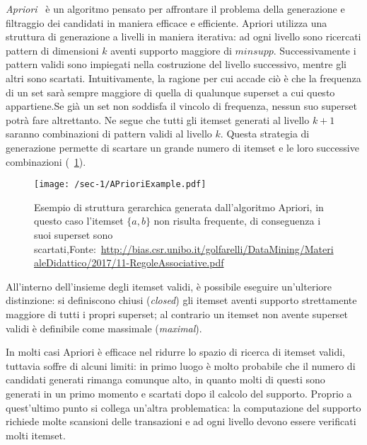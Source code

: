 \textit{Apriori}~\cite{agarwal2001tree} è un algoritmo pensato per affrontare il problema della generazione
e filtraggio dei candidati in maniera efficace e efficiente.
Apriori utilizza una struttura di generazione a livelli in maniera iterativa: ad ogni livello sono ricercati pattern di dimensioni \(k\)
aventi supporto maggiore di \(minsupp\).
Successivamente i pattern validi sono impiegati nella costruzione
del livello successivo, mentre gli altri sono scartati.
Intuitivamente, la ragione per cui accade ciò è che la frequenza di un set sarà sempre maggiore di
quella di qualunque superset a cui questo appartiene.Se già un set non soddisfa il vincolo di frequenza,
nessun suo superset potrà fare altrettanto.
Ne segue che tutti gli itemset generati al livello \(k + 1\) saranno combinazioni di pattern validi al livello
\(k\).
Questa strategia di generazione permette di scartare un grande numero di itemset e le loro successive
combinazioni (~\cref{fig:chap-1:apriori-example}).

\begin{figure}
  \texttt{[image: /sec-1/APrioriExample.pdf]}
  \caption{Esempio di struttura gerarchica generata dall'algoritmo Apriori, in questo caso l'itemset \( \{ a,b \} \) non risulta frequente, di conseguenza i suoi superset sono scartati,Fonte:~\url{http://bias.csr.unibo.it/golfarelli/DataMining/MaterialeDidattico/2017/11-RegoleAssociative.pdf}}%
  \label{fig:chap-1:apriori-example}
\end{figure}

All'interno dell'insieme degli itemset validi, è possibile eseguire un'ulteriore distinzione:
si definiscono chiusi (\textit{closed}) gli itemset aventi supporto strettamente maggiore di
tutti i propri superset; al contrario un itemset non avente superset validi è definibile come
massimale (\textit{maximal}).

In molti casi Apriori è efficace nel ridurre lo spazio di ricerca di itemset validi, tuttavia
soffre di alcuni limiti: in primo luogo è molto probabile che il numero di candidati generati rimanga comunque
alto, in quanto molti di questi sono generati in un primo momento e scartati dopo il calcolo del supporto.
Proprio a quest'ultimo punto si collega un'altra problematica: la computazione del supporto richiede molte
scansioni delle transazioni e ad ogni livello devono essere verificati molti itemset.
